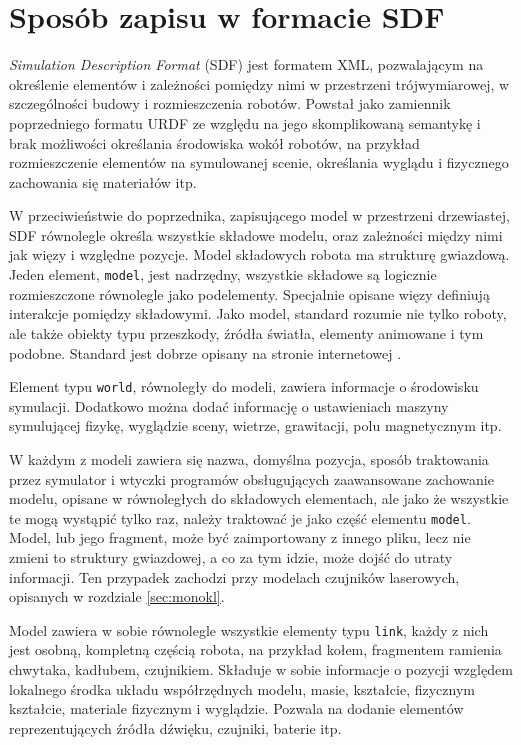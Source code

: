\section{Sposób zapisu w formacie SDF}
\label{sec:sdf}
	\emph{Simulation Description Format} (SDF) jest formatem XML, pozwalającym na określenie elementów i zależności pomiędzy nimi w przestrzeni trójwymiarowej, 
	w szczególności budowy i rozmieszczenia robotów.
	Powstał jako zamiennik poprzedniego formatu URDF ze względu na jego skomplikowaną semantykę i brak możliwości określania środowiska wokół robotów, 
	na przykład rozmieszczenie elementów na symulowanej scenie, określania wyglądu i fizycznego zachowania się materiałów itp.

	W przeciwieństwie do poprzednika, zapisującego model w przestrzeni drzewiastej, SDF równolegle określa wszystkie składowe modelu, 
	oraz zależności między nimi jak więzy i względne pozycje.
	Model składowych robota ma strukturę gwiazdową. Jeden element, \texttt{model}, jest nadrzędny, wszystkie składowe są logicznie rozmieszczone równolegle jako podelementy.
	Specjalnie opisane więzy definiują interakcje pomiędzy składowymi.
	Jako model, standard rozumie nie tylko roboty, ale także obiekty typu przeszkody, źródła światła, elementy animowane i tym podobne.
	Standard jest dobrze opisany na stronie internetowej \cite{sdf_website}.

	Element typu \texttt{world}, równoległy do modeli, zawiera informacje o środowisku symulacji.
	Dodatkowo można dodać informację o ustawieniach maszyny symulującej fizykę, wyglądzie sceny, wietrze, grawitacji, polu magnetycznym itp.

	W każdym z modeli zawiera się nazwa, domyślna pozycja, sposób traktowania przez symulator i wtyczki programów obsługujących zaawansowane zachowanie modelu,
	opisane w równoległych do składowych elementach, ale jako że wszystkie te mogą wystąpić tylko raz, należy traktować je jako część elementu \texttt{model}.
	Model, lub jego fragment, może być zaimportowany z innego pliku, lecz nie zmieni to struktury gwiazdowej, a co za tym idzie, może dojść do utraty informacji.
	Ten przypadek zachodzi przy modelach czujników laserowych, opisanych w rozdziale \ref{sec:monokl}.

	Model zawiera w sobie równolegle wszystkie elementy typu \texttt{link}, każdy z nich jest osobną, kompletną częścią robota, na przykład kołem, 
	fragmentem ramienia chwytaka, kadłubem, czujnikiem.
	Składuje w sobie informacje o pozycji względem lokalnego środka układu współrzędnych modelu, masie, kształcie, fizycznym kształcie, materiale fizycznym i wyglądzie.
	Pozwala na dodanie elementów reprezentujących źródła dźwięku, czujniki, baterie itp.

